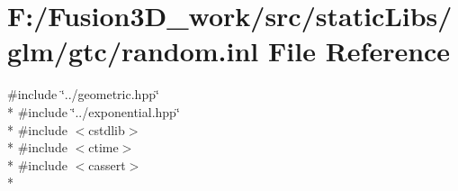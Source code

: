 \hypertarget{random_8inl}{}\section{F\+:/\+Fusion3\+D\+\_\+work/src/static\+Libs/glm/gtc/random.inl File Reference}
\label{random_8inl}
{\ttfamily \#include \char`\"{}../geometric.\+hpp\char`\"{}}\\*
{\ttfamily \#include \char`\"{}../exponential.\+hpp\char`\"{}}\\*
{\ttfamily \#include $<$cstdlib$>$}\\*
{\ttfamily \#include $<$ctime$>$}\\*
{\ttfamily \#include $<$cassert$>$}\\*
